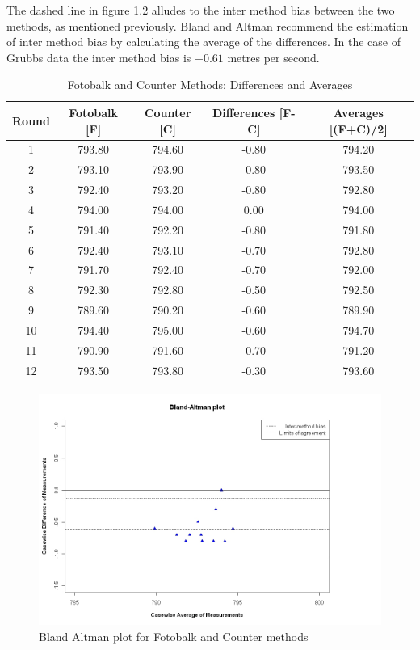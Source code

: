 \documentclass[12pt, a4paper]{report}
\begin{document}
The dashed line in figure 1.2 alludes to the inter method bias between the two methods, as mentioned previously. Bland and Altman
recommend the estimation of inter method bias by calculating the average of the differences. In the case of Grubbs data the inter
method bias is $-0.61$ metres per second.
\newpage
\begin{table}[tbh]
\begin{center}

\begin{tabular}{|c|c|c|c|c|}
  \hline
 Round & Fotobalk [F] & Counter [C] & Differences [F-C] & Averages [(F+C)/2] \\
  \hline
1 & 793.80 & 794.60 & -0.80 & 794.20 \\
  2 & 793.10 & 793.90 & -0.80 & 793.50 \\
  3 & 792.40 & 793.20 & -0.80 & 792.80 \\
  4 & 794.00 & 794.00 & 0.00 & 794.00 \\
  5 & 791.40 & 792.20 & -0.80 & 791.80 \\
  6 & 792.40 & 793.10 & -0.70 & 792.80 \\
  7 & 791.70 & 792.40 & -0.70 & 792.00 \\
  8 & 792.30 & 792.80 & -0.50 & 792.50 \\
  9 & 789.60 & 790.20 & -0.60 & 789.90 \\
  10 & 794.40 & 795.00 & -0.60 & 794.70 \\
  11 & 790.90 & 791.60 & -0.70 & 791.20 \\
  12 & 793.50 & 793.80 & -0.30 & 793.60 \\
   \hline
\end{tabular}
\caption{Fotobalk and Counter Methods: Differences and Averages}
\end{center}
\end{table}

\begin{figure}[h!]
\begin{center}
  \includegraphics[width=120mm]{GrubbsBAplot.jpeg}
  \caption{Bland Altman plot for Fotobalk and Counter methods}\label{GrubbsBA}
\end{center}
\end{figure}
\newpage
\end{document}
